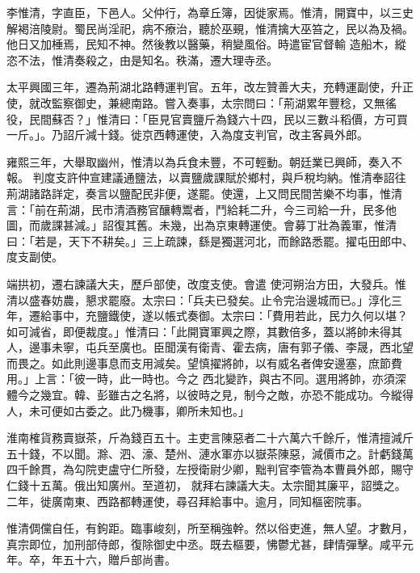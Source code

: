 \begin{pinyinscope}
 李惟清，字直臣，下邑人。父仲行，為章丘簿，因徙家焉。惟清，開寶中，以三史解褐涪陵尉。蜀民尚淫祀，病不療治，聽於巫覡，惟清擒大巫笞之，民以為及禍。他日又加棰焉，民知不神。然後教以醫藥，稍變風俗。時遣宦官督輸
 造船木，縱恣不法，惟清奏殺之，由是知名。秩滿，遷大理寺丞。



 太平興國三年，遷為荊湖北路轉運判官。五年，改左贊善大夫，充轉運副使，升正使，就改監察御史，兼總南路。嘗入奏事，太宗問曰：「荊湖累年豐稔，又無徭役，民間蘇否？」惟清曰：「臣見官賣鹽斤為錢六十四，民以三數斗稻價，方可買一斤。」。乃詔斤減十錢。徙京西轉運使，入為度支判官，改主客員外郎。



 雍熙三年，大舉取幽州，惟清以為兵食未豐，不可輕動。朝廷業已興師，奏入不報。
 判度支許仲宣建議通鹽法，以賣鹽歲課賦於鄉村，與戶稅均納。惟清奉詔往荊湖諸路詳定，奏言以鹽配民非便，遂罷。使還，上又問民間苦樂不均事，惟清言：「前在荊湖，民市清酒務官釀轉鬻者，鬥給耗二升，今三司給一升，民多他圖，而歲課甚減。」詔復其舊。未幾，出為京東轉運使。會募丁壯為義軍，惟清曰：「若是，天下不耕矣。」三上疏諫，繇是獨選河北，而餘路悉罷。擢屯田郎中、度支副使。



 端拱初，遷右諫議大夫，歷戶部使，改度支使。會遣
 使河朔治方田，大發兵。惟清以盛春妨農，懇求罷廢。太宗曰：「兵夫已發矣。止令完治邊城而已。」淳化三年，遷給事中，充鹽鐵使，遂以帳式奏御。太宗曰：「費用若此，民力久何以堪？如可減省，即便裁度。」惟清曰：「此開寶軍興之際，其數倍多，蓋以將帥未得其人，邊事未寧，屯兵至廣也。臣聞漢有衛青、霍去病，唐有郭子儀、李晟，西北望而畏之。如此則邊事息而支用減矣。望慎擢將帥，以有威名者俾安邊塞，庶節費用。」上言：「彼一時，此一時也。今之
 西北變詐，與古不同。選用將帥，亦須深體今之幾宜。韓、彭雖古之名將，以彼時之見，制今之敵，亦恐不能成功。今縱得人，未可便如古委之。此乃機事，卿所未知也。」



 淮南榷貨務賣嶽茶，斤為錢百五十。主吏言陳惡者二十六萬六千餘斤，惟清擅減斤五十錢，不以聞。滁、泗、濠、楚州、漣水軍亦以嶽茶陳惡，減價市之。計虧錢萬四千餘貫，為勾院吏盧守仁所發，左授衛尉少卿，黜判官李管為本曹員外郎，賜守仁錢十五萬。俄出知廣州。至道初，
 就拜右諫議大夫。太宗聞其廉平，詔獎之。二年，徙廣南東、西路都轉運使，尋召拜給事中。逾月，同知樞密院事。



 惟清倜儻自任，有鉤距。臨事峻刻，所至稱強幹。然以俗吏進，無人望。才數月，真宗即位，加刑部侍郎，復除御史中丞。既去樞要，怫鬱尤甚，肆情彈擊。咸平元年。卒，年五十六，贈戶部尚書。




\end{pinyinscope}
